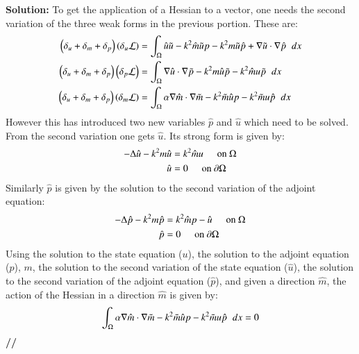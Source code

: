 \documentclass[11pt]{article}
\newenvironment{solution}{\begin{trivlist}\item[]{\bf Solution:}}
                      {\textbf{//} \end{trivlist}}
\begin{document}
\begin{enumerate}
\begin{solution}
To get the application of a Hessian to a vector, one needs the second
 variation of the three weak forms in the previous portion. These are: 
\begin{align}
\left(\delta_u+\delta_m+\delta_p\right)\left(\delta_u\mathcal{L}\right)
 &= \int_\Omega \hat{u}\tilde{u} - k^2\hat{m}\tilde{u}p -
 k^2m\tilde{u}\hat{p} + \nabla\tilde{u}\cdot\nabla\hat{p} \hspace{2 mm}
 dx \nonumber \\ 
\left(\delta_u+\delta_m+\delta_p\right)\left(\delta_p\mathcal{L}\right)
 &= \int_\Omega \nabla\hat{u}\cdot\nabla\tilde{p} - k^2m\hat{u}\tilde{p}
 - k^2\hat{m}u\tilde{p} \hspace{2 mm} dx \nonumber \\ 
\left(\delta_u+\delta_m+\delta_p\right)\left(\delta_m\mathcal{L}\right)
 &= \int_\Omega \alpha\nabla\hat{m}\cdot\nabla\tilde{m} -
 k^2\tilde{m}\hat{u}p - k^2\tilde{m}u\hat{p} \hspace{2 mm} dx \nonumber 
\end{align}
However this has introduced two new variables $\hat{p}$ and $\hat{u}$
 which need to be solved. From the second variation one gets
 $\hat{u}$. Its strong form is given by:  
\begin{align}
-\Delta\hat{u}-k^2m\hat{u} &= k^2\hat{m}u \hspace{5 mm} \text{on }
 \Omega \nonumber \\ 
\hat{u} &= 0 \hspace{5 mm} \text{on } \partial\Omega \nonumber
\end{align}
Similarly $\hat{p}$ is given by the solution to the second variation of the adjoint equation:
\begin{align}
-\Delta\hat{p} - k^2m\hat{p} &= k^2\hat{m}p - \hat{u}\hspace{5 mm} \text{on } \Omega \nonumber \\
\hat{p} &= 0 \hspace{5 mm} \text{on } \partial\Omega \nonumber
\end{align}
Using the solution to the state equation ($u$), the solution to the
 adjoint equation ($p$), $m$, the solution to the second variation of
 the state equation ($\hat{u}$), the solution to the second variation of
 the adjoint equation ($\hat{p}$), and given a direction $\hat{m}$, the
 action of the Hessian in a direction $\hat{m}$ is given by: 
\begin{displaymath}
\int_\Omega \alpha\nabla\hat{m}\cdot\nabla\tilde{m} -
 k^2\tilde{m}\hat{u}p - k^2\tilde{m}u\hat{p} \hspace{2 mm} dx = 0 
\end{displaymath}
\end{solution}


\end{enumerate}
\end{document}
